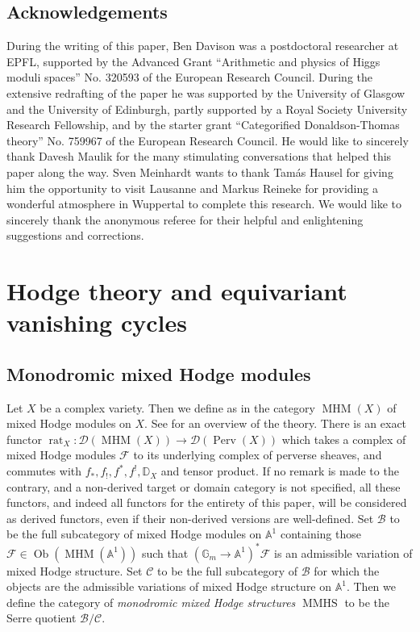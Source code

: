 \documentclass[a4paper,10pt]{amsart}
\newcommand{\DD}{\mathbb{D}}
\DeclareMathOperator{\MMHS}{MMHS}
\DeclareMathOperator{\rat}{rat}
\DeclareMathOperator{\perv}{Perv}
\DeclareMathOperator{\MHM}{MHM}
\DeclareMathOperator{\Ob}{Ob}
\newcommand{\Dub}{\mathcal{D}}
\begin{document}
\subsection{Acknowledgements}
During the writing of this paper, Ben Davison was a postdoctoral researcher at EPFL, supported by the Advanced Grant ``Arithmetic and physics of Higgs
moduli spaces'' No. 320593 of the European Research Council.  During the extensive redrafting of the paper he was supported by the University of Glasgow and the University of Edinburgh, partly supported by a Royal Society University Research Fellowship, and by the starter grant ``Categorified Donaldson-Thomas theory'' No. 759967 of the European Research Council.  He would like to sincerely thank Davesh Maulik for the many stimulating conversations that helped this paper along the way. Sven Meinhardt wants to thank Tam\'{a}s Hausel for giving him the opportunity to visit  Lausanne and Markus Reineke for providing a wonderful atmosphere in Wuppertal to complete this research.  We would like to sincerely thank the anonymous referee for their helpful and enlightening suggestions and corrections.
\section{Hodge theory and equivariant vanishing cycles}
\subsection{Monodromic mixed Hodge modules}
\label{MMHMs}
Let $X$ be a complex variety.  Then we define as in \cite{Saito89,Saito90} the category $\MHM(X)$ of mixed Hodge modules on $X$.  See \cite{Saito1} for an overview of the theory.  There is an exact functor $\rat_X\colon \Dub(\MHM(X))\rightarrow\Dub(\perv(X))$ which takes a complex of mixed Hodge modules $\mathcal{F}$ to its underlying complex of perverse sheaves, and commutes with $f_*,f_!,f^*,f^!,\DD_X$ and tensor product.  If no remark is made to the contrary, and a non-derived target or domain category is not specified, all these functors, and indeed all functors for the entirety of this paper, will be considered as derived functors, even if their non-derived versions are well-defined.  
\smallbreak
Set $\mathcal{B}$ to be the full subcategory of mixed Hodge modules on $\mathbb{A}^1$ containing those $\mathcal{F}\in\Ob(\MHM(\mathbb{A}^1))$ such that $(\mathbb{G}_m\rightarrow \mathbb{A}^1)^*\mathcal{F}$ is an admissible variation of mixed Hodge structure.  Set $\mathcal{C}$ to be the full subcategory of $\mathcal{B}$ for which the objects are the admissible variations of mixed Hodge structure on $\mathbb{A}^1$.  Then we define the category of \textit{monodromic mixed Hodge structures} $\MMHS$ to be the Serre quotient $\mathcal{B}/\mathcal{C}$.
\end{document}
